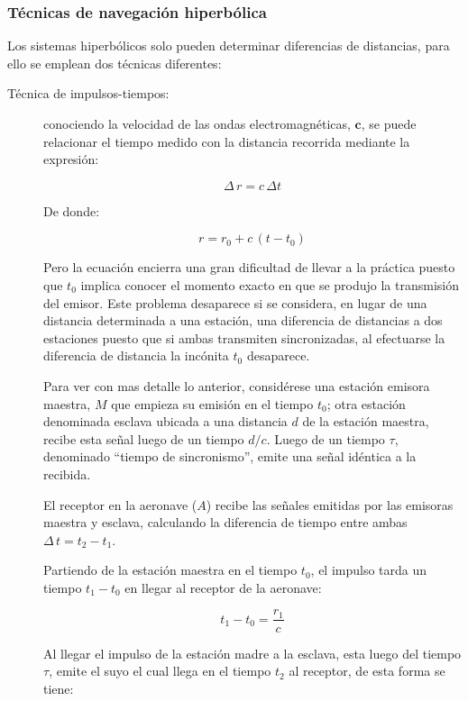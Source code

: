 \subsubsection{T\'ecnicas de navegaci\'on hiperb\'olica}

Los sistemas hiperb\'olicos solo pueden determinar diferencias de distancias, para ello se emplean dos t\'ecnicas diferentes:

\begin{description}
\item [T\'ecnica de impulsos-tiempos:] conociendo la velocidad de las ondas electromagn\'eticas, $\mathbf{c}$, se puede relacionar el tiempo medido con la distancia recorrida mediante la expresi\'on:

\[ \Delta\,r = c\,\Delta t
\]

De donde:

\[ r = r_0+c\,\left(t-t_0\right)
\]


Pero la ecuaci\'on encierra una gran dificultad de llevar a la pr\'actica puesto que $t_0$ implica conocer el momento exacto en que se produjo la transmisi\'on del emisor. Este problema desaparece si se considera, en lugar de una distancia determinada a una estaci\'on, una diferencia de distancias a dos estaciones puesto que si ambas transmiten sincronizadas, al efectuarse la diferencia de distancia la inc\'onita $t_0$ desaparece.

Para ver con mas detalle lo anterior, consid\'erese una estaci\'on emisora maestra, $M$  que empieza su emisi\'on en el tiempo $t_0$; otra estaci\'on denominada esclava ubicada a una distancia $d$ de la estaci\'on maestra, recibe esta se\~nal luego de un tiempo $d/c$. Luego de un tiempo $\tau$, denominado ``tiempo de sincronismo'', emite una se\~nal id\'entica a la recibida. 

El receptor en la aeronave ($A$) recibe las se\~nales emitidas por las emisoras maestra y esclava, calculando la diferencia de tiempo entre ambas $\Delta\,t = t_2-t_1$. 

Partiendo de la estaci\'on maestra en el tiempo $t_0$, el impulso tarda un tiempo $t_1-t_0$ en llegar al receptor de la aeronave:

\[t_1-t_0 = \displaystyle \frac{r_1}{c}
\]

Al llegar el impulso de la estaci\'on madre a la esclava, esta luego del tiempo $\tau$, emite el suyo el cual llega en el tiempo $t_2$ al receptor, de esta forma se tiene:


\end{description}
